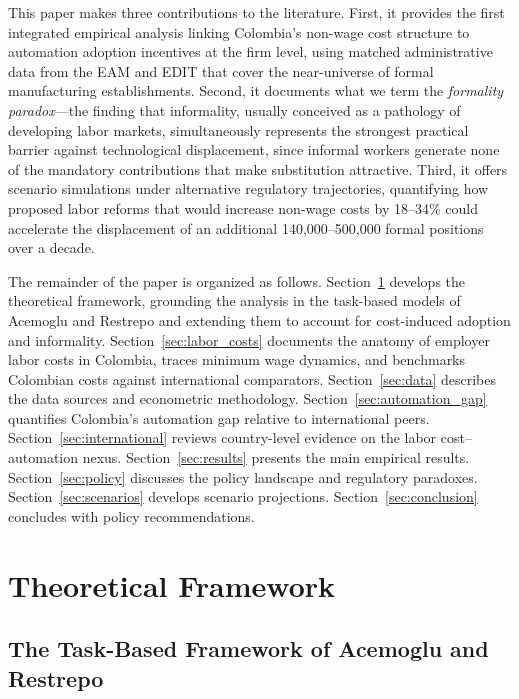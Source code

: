 This paper makes three contributions to the literature. First, it provides the first integrated empirical analysis linking Colombia's non-wage cost structure to automation adoption incentives at the firm level, using matched administrative data from the EAM and EDIT that cover the near-universe of formal manufacturing establishments. Second, it documents what we term the \textit{formality paradox}---the finding that informality, usually conceived as a pathology of developing labor markets, simultaneously represents the strongest practical barrier against technological displacement, since informal workers generate none of the mandatory contributions that make substitution attractive. Third, it offers scenario simulations under alternative regulatory trajectories, quantifying how proposed labor reforms that would increase non-wage costs by 18--34\% could accelerate the displacement of an additional 140,000--500,000 formal positions over a decade.

The remainder of the paper is organized as follows. Section~\ref{sec:theory} develops the theoretical framework, grounding the analysis in the task-based models of Acemoglu and Restrepo and extending them to account for cost-induced adoption and informality. Section~\ref{sec:labor_costs} documents the anatomy of employer labor costs in Colombia, traces minimum wage dynamics, and benchmarks Colombian costs against international comparators. Section~\ref{sec:data} describes the data sources and econometric methodology. Section~\ref{sec:automation_gap} quantifies Colombia's automation gap relative to international peers. Section~\ref{sec:international} reviews country-level evidence on the labor cost--automation nexus. Section~\ref{sec:results} presents the main empirical results. Section~\ref{sec:policy} discusses the policy landscape and regulatory paradoxes. Section~\ref{sec:scenarios} develops scenario projections. Section~\ref{sec:conclusion} concludes with policy recommendations.


\section{Theoretical Framework}
\label{sec:theory}

\subsection{The Task-Based Framework of Acemoglu and Restrepo}
\label{subsec:task_framework}

